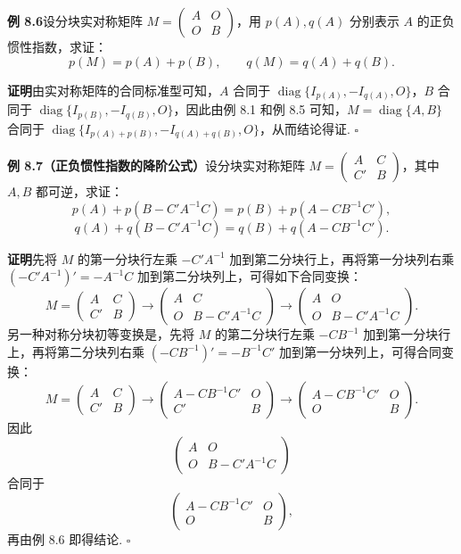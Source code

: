 \documentclass[UTF8,12pt,a4paper,fontset=fandol]{ctexart}
\begin{document}
\noindent\textbf{例 8.6}\quad 设分块实对称矩阵 $M=\left(\begin{array}{cc}A&O\\ O&B\end{array}\right)$，用 $p(A),q(A)$ 分别表示 $A$ 的正负惯性指数，求证：
\[
p(M)=p(A)+p(B),\qquad q(M)=q(A)+q(B).
\]

\noindent\textbf{证明}\quad 由实对称矩阵的合同标准型可知，$A$ 合同于 $\operatorname{diag}\{I_{p(A)},-I_{q(A)},O\}$，$B$ 合同于 $\operatorname{diag}\{I_{p(B)},-I_{q(B)},O\}$，因此由例 8.1 和例 8.5 可知，$M=\operatorname{diag}\{A,B\}$ 合同于 $\operatorname{diag}\{I_{p(A)+p(B)},-I_{q(A)+q(B)},O\}$，从而结论得证. $\ensuremath{\square}$

\noindent\textbf{例 8.7（正负惯性指数的降阶公式）}\quad 设分块实对称矩阵 $M=\left(\begin{array}{cc}A&C\\ C'&B\end{array}\right)$，其中 $A,B$ 都可逆，求证：
\[
p(A)+p(B-C'A^{-1}C)=p(B)+p(A-CB^{-1}C'),
\]
\[
q(A)+q(B-C'A^{-1}C)=q(B)+q(A-CB^{-1}C').
\]

\noindent\textbf{证明}\quad 先将 $M$ 的第一分块行左乘 $-C'A^{-1}$ 加到第二分块行上，再将第一分块列右乘 $(-C'A^{-1})'=-A^{-1}C$ 加到第二分块列上，可得如下合同变换：
\[
M=\left(\begin{array}{cc}
A & C\\
C' & B
\end{array}\right)
\to
\left(\begin{array}{cc}
A & C\\
O & B-C'A^{-1}C
\end{array}\right)
\to
\left(\begin{array}{cc}
A & O\\
O & B-C'A^{-1}C
\end{array}\right).
\]
另一种对称分块初等变换是，先将 $M$ 的第二分块行左乘 $-CB^{-1}$ 加到第一分块行上，再将第二分块列右乘 $(-CB^{-1})'=-B^{-1}C'$ 加到第一分块列上，可得合同变换：
\[
M=\left(\begin{array}{cc}
A & C\\
C' & B
\end{array}\right)
\to
\left(\begin{array}{cc}
A-CB^{-1}C' & O\\
C' & B
\end{array}\right)
\to
\left(\begin{array}{cc}
A-CB^{-1}C' & O\\
O & B
\end{array}\right).
\]
因此
\[
\left(\begin{array}{cc}
A & O\\
O & B-C'A^{-1}C
\end{array}\right)
\]
合同于
\[
\left(\begin{array}{cc}
A-CB^{-1}C' & O\\
O & B
\end{array}\right),
\]
再由例 8.6 即得结论. $\ensuremath{\square}$
\end{document}
